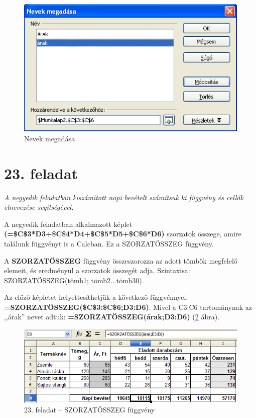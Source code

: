 \begin{figure}[!h]
\begin{center}
\includegraphics[width=11.562cm]{oocalcv2-img105.png}
\caption{Nevek megadása}\label{NevekMegadása}
\end{center}
\end{figure}


\section{23. feladat }

{\itshape
A negyedik feladatban kiszámított napi bevételt számítsuk ki
függvény és cellák elnevezése segítségével.}

A negyedik feladatban alkalmazott képlet
{\sffamily\bfseries{(=\$C\$3*D3+\$C\$4*D4+\$C\$5*D5+\$C\$6*D6)}}
szorzatok összege, amire találunk függvényt is a Calcban. Ez a
SZORZATÖSSZEG függvény.

A \textbf{SZORZATÖSSZEG} függvény
összeszorozza az adott tömbök megfelelő elemeit, és
eredményül a szorzatok összegét adja. Szintaxisa:
SZORZATÖSSZEG(tömb1; tömb2...tömb30).

Az előző képletet helyettesíthetjük a következő függvénnyel:\\
{\sffamily\bfseries{=SZORZATÖSSZEG(\$C\$3:\$C\$6;D3:D6)}}.
Mivel a C3:C6 tartománynak az ,,árak'' nevet adtuk:
{\sffamily\bfseries{=SZORZATÖSSZEG(árak;D3:D6)}} (\ref{23-feladatSUMPRODUCT} ábra).

\begin{figure}[!h]
\begin{center}
\includegraphics[width=15.212cm]{oocalcv2-img106.png}
\caption{23. feladat --  SZORZATÖSSZEG függvény}\label{23-feladatSUMPRODUCT}
\end{center}
\end{figure}


